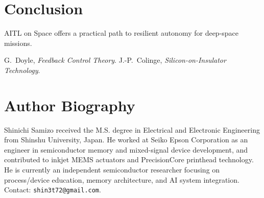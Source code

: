 \documentclass[conference]{IEEEtran}
\begin{document}
\section{Conclusion}
AITL on Space offers a practical path to resilient autonomy for deep-space missions.

\begin{thebibliography}{99}\footnotesize
{}
G.~Doyle, \emph{Feedback Control Theory}.
J.-P.~Colinge, \emph{Silicon-on-Insulator Technology}.
\end{thebibliography}

\section*{Author Biography}
\noindent
Shinichi Samizo received the M.S. degree in Electrical and Electronic Engineering from Shinshu University, Japan. He worked at Seiko Epson Corporation as an engineer in semiconductor memory and mixed-signal device development, and contributed to inkjet MEMS actuators and PrecisionCore printhead technology. He is currently an independent semiconductor researcher focusing on process/device education, memory architecture, and AI system integration. Contact: \texttt{shin3t72@gmail.com}.
\end{document}
